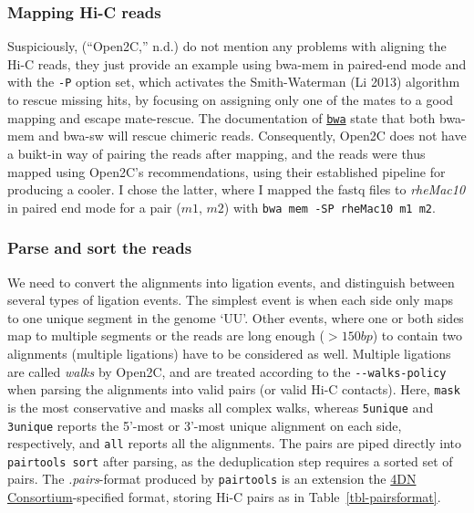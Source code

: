 \documentclass[
  11pt,
  a4paper,
]{scrbook}
\begin{document}
\subsubsection{Mapping Hi-C reads}\label{mapping-hi-c-reads}

Suspiciously, ({``{Open2C},''} n.d.) do not mention any problems with
aligning the Hi-C reads, they just provide an example using bwa-mem in
paired-end mode and with the \texttt{-P} option set, which activates the
Smith-Waterman (Li 2013) algorithm to rescue missing hits, by focusing
on assigning only one of the mates to a good mapping and escape
mate-rescue. The documentation of
\href{https://bio-bwa.sourceforge.net}{\texttt{bwa}} state that both
bwa-mem and bwa-sw will rescue chimeric reads. Consequently, Open2C does
not have a buikt-in way of pairing the reads after mapping, and the
reads were thus mapped using Open2C's recommendations, using their
established pipeline for producing a cooler. I chose the latter, where I
mapped the fastq files to \emph{rheMac10} in paired end mode for a pair
(\(m1\), \(m2\)) with \texttt{bwa\ mem\ -SP\ rheMac10\ m1\ m2}.

\subsubsection{Parse and sort the reads}\label{parse-and-sort-the-reads}

We need to convert the alignments into ligation events, and distinguish
between several types of ligation events. The simplest event is when
each side only maps to one unique segment in the genome `UU'. Other
events, where one or both sides map to multiple segments or the reads
are long enough (\(>150bp\)) to contain two alignments (multiple
ligations) have to be considered as well. Multiple ligations are called
\emph{walks} by Open2C, and are treated according to the
\texttt{-\/-walks-policy} when parsing the alignments into valid pairs
(or valid Hi-C contacts). Here, \texttt{mask} is the most conservative
and masks all complex walks, whereas \texttt{5unique} and
\texttt{3unique} reports the 5'-most or 3'-most unique alignment on each
side, respectively, and \texttt{all} reports all the alignments. The
pairs are piped directly into \texttt{pairtools\ sort} after parsing, as
the deduplication step requires a sorted set of pairs. The
\emph{.pairs}-format produced by \texttt{pairtools} is an extension the
\href{https://data.4dnucleome.org/file-formats/pairs/}{4DN
Consortium}-specified format, storing Hi-C pairs as in
Table~\ref{tbl-pairsformat}.
\end{document}
